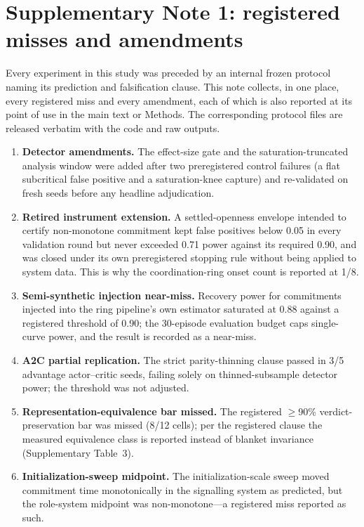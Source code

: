 \documentclass[11pt]{article}
\begin{document}
\section*{Supplementary Note 1: registered misses and amendments}

Every experiment in this study was preceded by an internal frozen
protocol naming its prediction and falsification clause. This note
collects, in one place, every registered miss and every amendment,
each of which is also reported at its point of use in the main text
or Methods. The corresponding protocol files are released verbatim
with the code and raw outputs.

\begin{enumerate}
\item \textbf{Detector amendments.} The effect-size gate and the
saturation-truncated analysis window were added after two
preregistered control failures (a flat subcritical false positive and
a saturation-knee capture) and re-validated on fresh seeds before any
headline adjudication.
\item \textbf{Retired instrument extension.} A settled-openness
envelope intended to certify non-monotone commitment kept false
positives below 0.05 in every validation round but never exceeded
0.71 power against its required 0.90, and was closed under its own
preregistered stopping rule without being applied to system data.
This is why the coordination-ring onset count is reported at 1/8.
\item \textbf{Semi-synthetic injection near-miss.} Recovery power for
commitments injected into the ring pipeline's own estimator saturated
at 0.88 against a registered threshold of 0.90; the 30-episode
evaluation budget caps single-curve power, and the result is recorded
as a near-miss.
\item \textbf{A2C partial replication.} The strict parity-thinning
clause passed in 3/5 advantage actor--critic seeds, failing solely on
thinned-subsample detector power; the threshold was not adjusted.
\item \textbf{Representation-equivalence bar missed.} The registered
$\geq$90\% verdict-preservation bar was missed (8/12 cells); per the
registered clause the measured equivalence class is reported instead
of blanket invariance (Supplementary Table~3).
\item \textbf{Initialization-sweep midpoint.} The initialization-scale
sweep moved commitment time monotonically in the signalling system as
predicted, but the role-system midpoint was non-monotone---a
registered miss reported as such.

\end{enumerate}
\end{document}
